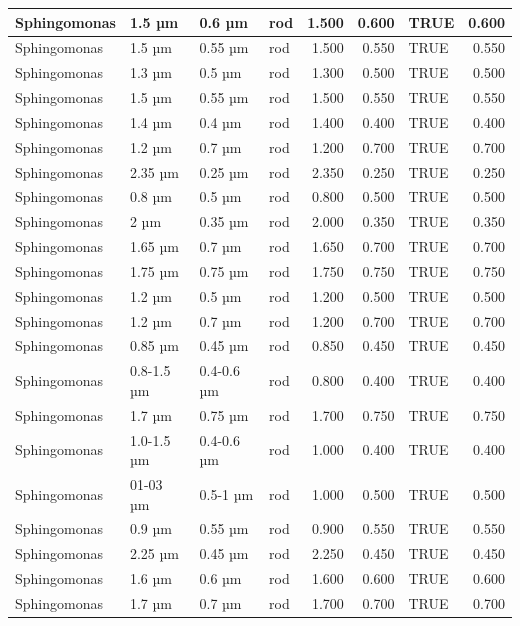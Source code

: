 \documentclass[
]{article}
\begin{document}
\begin{table}
\begin{tabular}{l|l|l|l|r|r|l|r}
\hline
Sphingomonas & 1.5 µm & 0.6 µm & rod & 1.500 & 0.600 & TRUE & 0.600\\
\hline
Sphingomonas & 1.5 µm & 0.55 µm & rod & 1.500 & 0.550 & TRUE & 0.550\\
\hline
Sphingomonas & 1.3 µm & 0.5 µm & rod & 1.300 & 0.500 & TRUE & 0.500\\
\hline
Sphingomonas & 1.5 µm & 0.55 µm & rod & 1.500 & 0.550 & TRUE & 0.550\\
\hline
Sphingomonas & 1.4 µm & 0.4 µm & rod & 1.400 & 0.400 & TRUE & 0.400\\
\hline
Sphingomonas & 1.2 µm & 0.7 µm & rod & 1.200 & 0.700 & TRUE & 0.700\\
\hline
Sphingomonas & 2.35 µm & 0.25 µm & rod & 2.350 & 0.250 & TRUE & 0.250\\
\hline
Sphingomonas & 0.8 µm & 0.5 µm & rod & 0.800 & 0.500 & TRUE & 0.500\\
\hline
Sphingomonas & 2 µm & 0.35 µm & rod & 2.000 & 0.350 & TRUE & 0.350\\
\hline
Sphingomonas & 1.65 µm & 0.7 µm & rod & 1.650 & 0.700 & TRUE & 0.700\\
\hline
Sphingomonas & 1.75 µm & 0.75 µm & rod & 1.750 & 0.750 & TRUE & 0.750\\
\hline
Sphingomonas & 1.2 µm & 0.5 µm & rod & 1.200 & 0.500 & TRUE & 0.500\\
\hline
Sphingomonas & 1.2 µm & 0.7 µm & rod & 1.200 & 0.700 & TRUE & 0.700\\
\hline
Sphingomonas & 0.85 µm & 0.45 µm & rod & 0.850 & 0.450 & TRUE & 0.450\\
\hline
Sphingomonas & 0.8-1.5 µm & 0.4-0.6 µm & rod & 0.800 & 0.400 & TRUE & 0.400\\
\hline
Sphingomonas & 1.7 µm & 0.75 µm & rod & 1.700 & 0.750 & TRUE & 0.750\\
\hline
Sphingomonas & 1.0-1.5 µm & 0.4-0.6 µm & rod & 1.000 & 0.400 & TRUE & 0.400\\
\hline
Sphingomonas & 01-03 µm & 0.5-1 µm & rod & 1.000 & 0.500 & TRUE & 0.500\\
\hline
Sphingomonas & 0.9 µm & 0.55 µm & rod & 0.900 & 0.550 & TRUE & 0.550\\
\hline
Sphingomonas & 2.25 µm & 0.45 µm & rod & 2.250 & 0.450 & TRUE & 0.450\\
\hline
Sphingomonas & 1.6 µm & 0.6 µm & rod & 1.600 & 0.600 & TRUE & 0.600\\
\hline
Sphingomonas & 1.7 µm & 0.7 µm & rod & 1.700 & 0.700 & TRUE & 0.700\\

\end{tabular}
\end{table}
\end{document}
